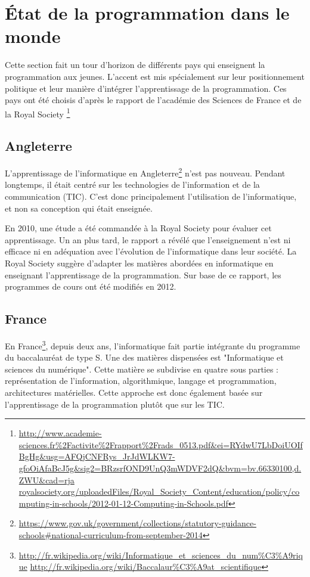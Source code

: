 ﻿\section{État de la programmation dans le monde}
\label{monde} 
Cette section fait un tour d'horizon de différents pays qui enseignent la programmation aux jeunes. L'accent est mis spécialement sur leur positionnement politique et leur manière d'intégrer l'apprentissage de la programmation. Ces pays ont été choisis d'après le rapport de l'académie des Sciences de France et de la Royal Society \footnote{\url{http://www.academie-sciences.fr\%2Factivite\%2Frapport\%2Frads\_0513.pdf\&ei=RYdwU7LbDoiUOIfBgHg\&usg=AFQjCNFRys\_JrJdWLKW7-gfoOiAfaBcJ5g\&sig2=BRzsrfOND9UnQ3mWDVF2dQ\&bvm=bv.66330100,d.ZWU\&cad=rja} \url{royalsociety.org/uploadedFiles/Royal\_Society\_Content/education/policy/computing-in-schools/2012-01-12-Computing-in-Schools.pdf}}
\subsection{Angleterre}
L'apprentissage de l'informatique en Angleterre\footnote{\url{https://www.gov.uk/government/collections/statutory-guidance-schools\#national-curriculum-from-september-2014}} n'est pas nouveau. Pendant longtemps, il était centré sur les technologies de l'information et de la communication (TIC). C'est donc principalement l'utilisation de l'informatique, et non sa conception qui était enseignée.

En 2010, une étude a été commandée à la Royal Society pour évaluer cet apprentissage. Un an plus tard, le rapport a révélé que l'enseignement n'est ni efficace ni en adéquation avec l'évolution de l'informatique dans leur société. La Royal Society suggère d'adapter les matières abordées en informatique en enseignant l'apprentissage de la programmation. Sur base de ce rapport, les programmes de cours ont été modifiés en 2012.

\subsection{France}
En France\footnote{\url{http://fr.wikipedia.org/wiki/Informatique\_et\_sciences\_du\_num\%C3\%A9rique}
\url{http://fr.wikipedia.org/wiki/Baccalaur\%C3\%A9at\_scientifique}}, depuis deux ans, l'informatique fait partie intégrante du programme du baccalauréat de type S. Une des matières dispensées est "Informatique et sciences du numérique". Cette matière se subdivise en quatre sous parties : représentation de l'information, algorithmique, langage et programmation, architectures matérielles. Cette approche est donc également basée sur l'apprentissage de la programmation plutôt que sur les TIC.

